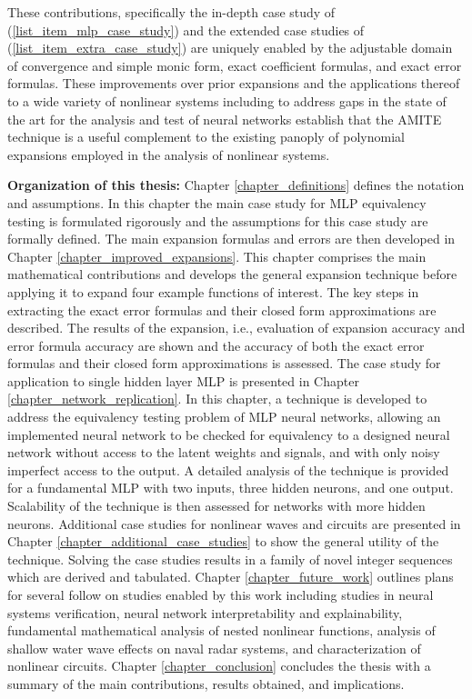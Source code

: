 These contributions, specifically the in-depth case study of (\ref{list_item_mlp_case_study}) and the extended case studies of (\ref{list_item_extra_case_study}) are uniquely enabled by the adjustable domain of convergence and simple monic form, exact coefficient formulas, and exact error formulas.  These improvements over prior expansions and the applications thereof to a wide variety of nonlinear systems including to address gaps in the state of the art for the analysis and test of neural networks establish that the AMITE technique is a useful complement to the existing panoply of polynomial expansions employed in the analysis of nonlinear systems.

\textbf{Organization of this thesis:}
Chapter \ref{chapter_definitions} defines the notation and assumptions.  In this chapter the main case study for MLP equivalency testing is formulated rigorously and the assumptions for this case study are formally defined.  The main expansion formulas and errors are then developed in Chapter \ref{chapter_improved_expansions}.  This chapter comprises the main mathematical contributions and develops the general expansion technique before applying it to expand four example functions of interest.  The key steps in extracting the exact error formulas and their closed form approximations are described.  The results of the expansion, i.e., evaluation of expansion accuracy and error formula accuracy are shown and the accuracy of both the exact error formulas and their closed form approximations is assessed.  The case study for application to single hidden layer MLP is presented in Chapter \ref{chapter_network_replication}.  In this chapter, a technique is developed to address the equivalency testing problem of MLP neural networks, allowing an implemented neural network to be checked for equivalency to a designed neural network without access to the latent weights and signals, and with only noisy imperfect access to the output.  A detailed analysis of the technique is provided for a fundamental MLP with two inputs, three hidden neurons, and one output. Scalability of the technique is then assessed for networks with more hidden neurons.  Additional case studies for nonlinear waves and circuits are presented in Chapter \ref{chapter_additional_case_studies} to show the general utility of the technique.  Solving the case studies results in a family of novel integer sequences which are derived and tabulated. Chapter \ref{chapter_future_work} outlines plans for several follow on studies enabled by this work including studies in neural systems verification, neural network interpretability and explainability, fundamental mathematical analysis of nested nonlinear functions, analysis of shallow water wave effects on naval radar systems, and characterization of nonlinear circuits. Chapter \ref{chapter_conclusion} concludes the thesis with a summary of the main contributions, results obtained, and implications.